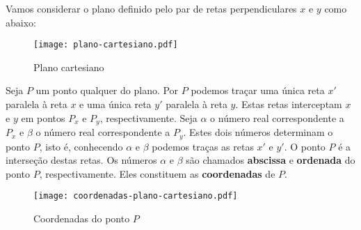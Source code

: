 Vamos considerar o plano definido pelo par de retas perpendiculares $x$ e $y$ como abaixo:
\begin{figure}[!h]
	\centering
	\caption{Plano cartesiano}
	\texttt{[image: plano-cartesiano.pdf]}
\end{figure}


Seja $P$ um ponto qualquer do plano. Por $P$ podemos tra\c{c}ar uma \'unica reta $x'$ paralela \`a reta $x$ e uma \'unica reta $y'$ paralela \`a reta $y$. Estas retas interceptam $x$ e $y$ em pontos $P_x$ e $P_y$, respectivamente. Seja $\alpha$ o n\'umero real correspondente a $P_x$ e $\beta$ o n\'umero real correspondente  a $P_y$. Estes dois n\'umeros determinam o ponto $P$, isto \'e, conhecendo $\alpha$ e $\beta$ podemos tra\c{c}as as retas $x'$ e $y'$. O ponto $P$ \'e a interse\c{c}\~ao destas retas. Os n\'umeros $\alpha$ e $\beta$ s\~ao chamados \textbf{abscissa} e \textbf{ordenada} do ponto $P$, respectivamente. Eles constituem as \textbf{coordenadas} de $P$.
\begin{figure}[!h]
	\centering
	\caption{Coordenadas do ponto $P$}
	\texttt{[image: coordenadas-plano-cartesiano.pdf]}
\end{figure}

